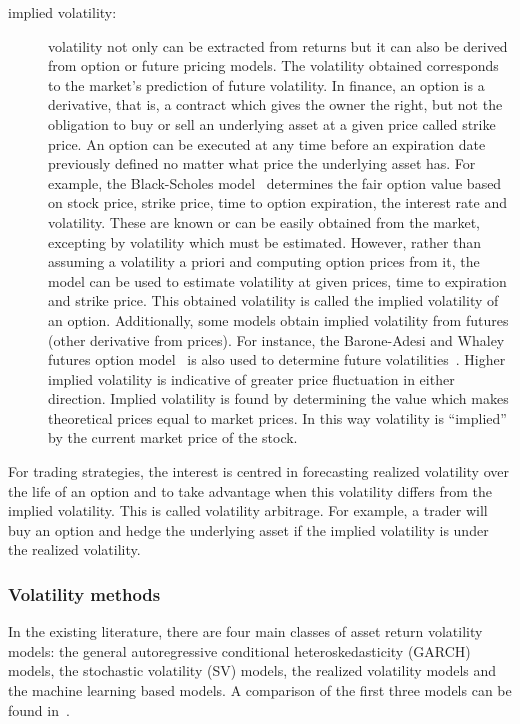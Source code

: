 \begin{description}
\item[implied volatility:] volatility not only can be extracted from returns but
it can also be derived from option or future pricing models.  The volatility
obtained corresponds to the market's prediction of future volatility. In
finance, an option is a derivative, that is, a contract which gives the owner
the right, but not the obligation to buy or sell an underlying asset at a given
price called strike price. An option can be executed at any time before an
expiration date previously defined no matter what price the underlying asset
has. For example, the Black-Scholes model~\cite{black1973} determines the fair
option value based on stock price, strike price, time to option expiration, the
interest rate and volatility. These are known or can be easily obtained from the
market, excepting by volatility which must be estimated. However, rather than
assuming a volatility a priori and computing option prices from it, the model
can be used to estimate volatility at given prices, time to expiration and
strike price. This obtained volatility is called the implied volatility of an
option. Additionally, some models obtain implied volatility from futures (other
derivative from prices). For instance, the Barone-Adesi and Whaley futures
option model~\cite{baroneetal1987} is also used to determine future
volatilities~\cite{hamidetal2004}. Higher implied volatility is indicative of
greater price fluctuation in either direction. Implied volatility is found by
determining the value which makes theoretical prices equal to market prices. In
this way volatility is ``implied'' by the current market price of the stock.

\end{description}


For trading strategies, the interest is centred in forecasting realized
volatility over the life of an option and to take advantage when this volatility
differs from the implied volatility. This is called volatility arbitrage. For
example, a trader will buy an option and hedge the underlying asset if the
implied volatility is under the realized volatility. 


\subsubsection{Volatility methods}

In the existing literature, there are four main classes of asset
return volatility models: the general autoregressive conditional
heteroskedasticity (GARCH) models, the stochastic volatility (SV)
models, the realized volatility models and the machine learning based
models. A comparison of the first three models can be found
in~\cite{wei2012}. 

